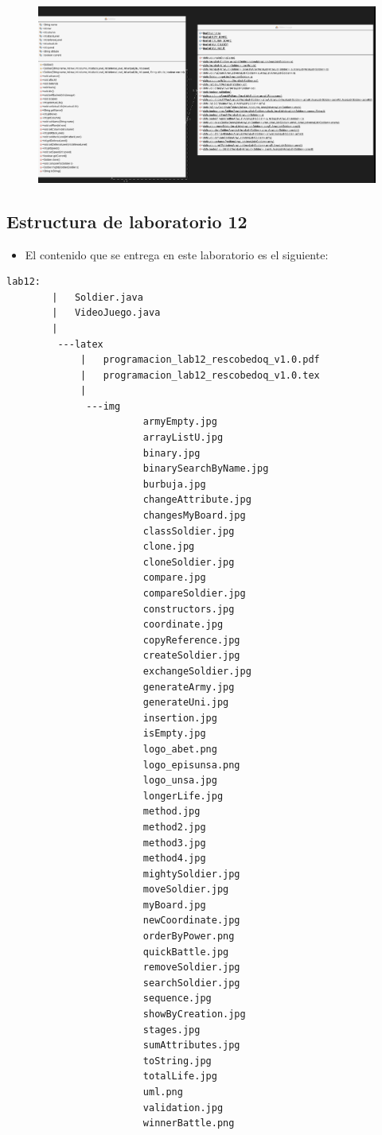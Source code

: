 \documentclass{article}
\begin{document}
	\begin{figure}[H]
		\centering
		\includegraphics[width=1\textwidth,keepaspectratio]{img/uml.png}
	\end{figure}
	
	
	\subsection{Estructura de laboratorio 12}
	\begin{itemize}	
		\item El contenido que se entrega en este laboratorio es el siguiente:
	\end{itemize}
	
	\begin{lstlisting}[style=ascii-tree]
		lab12:
		|   Soldier.java
		|   VideoJuego.java
		|
		 ---latex
			 |   programacion_lab12_rescobedoq_v1.0.pdf
			 |   programacion_lab12_rescobedoq_v1.0.tex
			 |
			  ---img
						armyEmpty.jpg
						arrayListU.jpg
						binary.jpg
						binarySearchByName.jpg
						burbuja.jpg
						changeAttribute.jpg
						changesMyBoard.jpg
						classSoldier.jpg
						clone.jpg
						cloneSoldier.jpg
						compare.jpg
						compareSoldier.jpg
						constructors.jpg
						coordinate.jpg
						copyReference.jpg
						createSoldier.jpg
						exchangeSoldier.jpg
						generateArmy.jpg
						generateUni.jpg
						insertion.jpg
						isEmpty.jpg
						logo_abet.png
						logo_episunsa.png
						logo_unsa.jpg
						longerLife.jpg
						method.jpg
						method2.jpg
						method3.jpg
						method4.jpg
						mightySoldier.jpg
						moveSoldier.jpg
						myBoard.jpg
						newCoordinate.jpg
						orderByPower.png
						quickBattle.jpg
						removeSoldier.jpg
						searchSoldier.jpg
						sequence.jpg
						showByCreation.jpg
						stages.jpg
						sumAttributes.jpg
						toString.jpg
						totalLife.jpg
						uml.png
						validation.jpg
						winnerBattle.png
			
	\end{lstlisting}    
	
\end{document}

